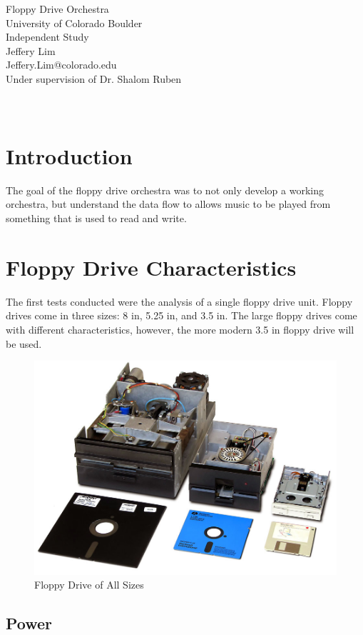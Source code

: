 \documentclass[11pt, a4paper]{report}
\begin{document}
\begin{center}
  \Huge Floppy Drive Orchestra \\
  \huge University of Colorado Boulder \\
  \Large Independent Study\\
  
  \vspace{6in}
    \huge Jeffery Lim \\
    \huge Jeffery.Lim@colorado.edu\\
    \Large Under supervision of Dr. Shalom Ruben \\~\\~\\
\end{center}
\pagebreak

\tableofcontents

\chapter{Introduction}

The goal of the floppy drive orchestra was to not only develop a working orchestra, but understand the data flow to allows music to be played from something that is used to read and write. 

\chapter{Floppy Drive Characteristics}

The first tests conducted were the analysis of a single floppy drive unit. Floppy drives come in three sizes: 8 in, 5.25 in, and 3.5 in. The large floppy drives come with different characteristics, however, the more modern 3.5 in floppy drive will be used.

\begin{figure}[H]
\hspace*{-2cm}    
    \centering
    \includegraphics[width=.3\textwidth]{floppydrive_sizes.jpg}
    \caption{Floppy Drive of All Sizes}
    \label{fig:sizes}
\end{figure}

\section{Power}
\end{document}
